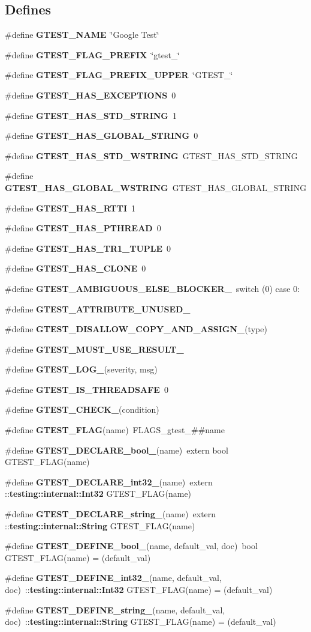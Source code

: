 \subsection*{Defines}
\begin{CompactItemize}
\item 
\#define {\bf GTEST\_\-NAME}~\char`\"{}Google Test\char`\"{}
\item 
\#define {\bf GTEST\_\-FLAG\_\-PREFIX}~\char`\"{}gtest\_\-\char`\"{}
\item 
\#define {\bf GTEST\_\-FLAG\_\-PREFIX\_\-UPPER}~\char`\"{}GTEST\_\-\char`\"{}
\item 
\#define {\bf GTEST\_\-HAS\_\-EXCEPTIONS}~0
\item 
\#define {\bf GTEST\_\-HAS\_\-STD\_\-STRING}~1
\item 
\#define {\bf GTEST\_\-HAS\_\-GLOBAL\_\-STRING}~0
\item 
\#define {\bf GTEST\_\-HAS\_\-STD\_\-WSTRING}~GTEST\_\-HAS\_\-STD\_\-STRING
\item 
\#define {\bf GTEST\_\-HAS\_\-GLOBAL\_\-WSTRING}~GTEST\_\-HAS\_\-GLOBAL\_\-STRING
\item 
\#define {\bf GTEST\_\-HAS\_\-RTTI}~1
\item 
\#define {\bf GTEST\_\-HAS\_\-PTHREAD}~0
\item 
\#define {\bf GTEST\_\-HAS\_\-TR1\_\-TUPLE}~0
\item 
\#define {\bf GTEST\_\-HAS\_\-CLONE}~0
\item 
\#define {\bf GTEST\_\-AMBIGUOUS\_\-ELSE\_\-BLOCKER\_\-}~switch (0) case 0:
\item 
\#define {\bf GTEST\_\-ATTRIBUTE\_\-UNUSED\_\-}
\item 
\#define {\bf GTEST\_\-DISALLOW\_\-COPY\_\-AND\_\-ASSIGN\_\-}(type)
\item 
\#define {\bf GTEST\_\-MUST\_\-USE\_\-RESULT\_\-}
\item 
\#define {\bf GTEST\_\-LOG\_\-}(severity, msg)
\item 
\#define {\bf GTEST\_\-IS\_\-THREADSAFE}~0
\item 
\#define {\bf GTEST\_\-CHECK\_\-}(condition)
\item 
\#define {\bf GTEST\_\-FLAG}(name)~FLAGS\_\-gtest\_\-\#\#name
\item 
\#define {\bf GTEST\_\-DECLARE\_\-bool\_\-}(name)~extern bool GTEST\_\-FLAG(name)
\item 
\#define {\bf GTEST\_\-DECLARE\_\-int32\_\-}(name)~extern ::{\bf testing::internal::Int32} GTEST\_\-FLAG(name)
\item 
\#define {\bf GTEST\_\-DECLARE\_\-string\_\-}(name)~extern ::{\bf testing::internal::String} GTEST\_\-FLAG(name)
\item 
\#define {\bf GTEST\_\-DEFINE\_\-bool\_\-}(name, default\_\-val, doc)~bool GTEST\_\-FLAG(name) = (default\_\-val)
\item 
\#define {\bf GTEST\_\-DEFINE\_\-int32\_\-}(name, default\_\-val, doc)~::{\bf testing::internal::Int32} GTEST\_\-FLAG(name) = (default\_\-val)
\item 
\#define {\bf GTEST\_\-DEFINE\_\-string\_\-}(name, default\_\-val, doc)~::{\bf testing::internal::String} GTEST\_\-FLAG(name) = (default\_\-val)
\end{CompactItemize}
